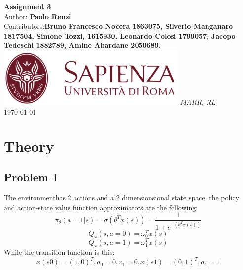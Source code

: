 \documentclass[10pt,a4paper]{article}
\begin{document}
\begin{titlepage}
    \begin{center}
        \vspace*{1cm}
        \Huge\textbf{Assignment 3}\\
        \vspace{1.5cm}
        \Large Author:
        \textbf{Paolo Renzi}\\
        \Large Contributors:\textbf{Bruno Francesco Nocera 1863075, Silverio Manganaro 1817504, Simone Tozzi, 1615930, Leonardo Colosi 1799057, Jacopo Tedeschi 1882789, Amine Ahardane 2050689.}
        \vspace{0.5cm}
        \vfill
        \includegraphics[width=0.7\textwidth]{../images/sapienza_logo.png}
        \vfill
        \vspace{0.8cm}
        \Large \textit{MARR, RL}\\
        \today
    \end{center}
\end{titlepage}
\newpage

\section*{Theory}
\subsection*{Problem 1}
The environmenthas 2 actions and a 2 dimensionsional state space. the policy and action-state value function approximators are the following:
\begin{equation*}
    \pi_\theta (a=1|s) = \sigma(\theta^T x(s)) = \frac{1}{1+e^{-(\theta^T x(s))}}
\end{equation*}
\begin{equation*}
    Q_\omega(s,a=0) = \omega_0^T x(s)
\end{equation*}
\begin{equation*}
    Q_\omega(s,a=1) = \omega_1^T x(s)
\end{equation*}
While the transition function is this:
\begin{equation*}
    x(s0) = (1, 0)^T , a_0 = 0, r_1 = 0, x(s1) = (0, 1)^T , a_1 = 1
\end{equation*}
\end{document}
